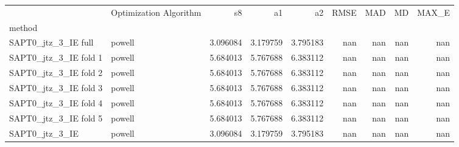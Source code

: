 \begin{tabular}{llrrrrrrr}
 & Optimization Algorithm & s8 & a1 & a2 & RMSE & MAD & MD & MAX_E \\
method &  &  &  &  &  &  &  &  \\
SAPT0_jtz_3_IE full & powell & 3.096084 & 3.179759 & 3.795183 & nan & nan & nan & nan \\
SAPT0_jtz_3_IE fold 1 & powell & 5.684013 & 5.767688 & 6.383112 & nan & nan & nan & nan \\
SAPT0_jtz_3_IE fold 2 & powell & 5.684013 & 5.767688 & 6.383112 & nan & nan & nan & nan \\
SAPT0_jtz_3_IE fold 3 & powell & 5.684013 & 5.767688 & 6.383112 & nan & nan & nan & nan \\
SAPT0_jtz_3_IE fold 4 & powell & 5.684013 & 5.767688 & 6.383112 & nan & nan & nan & nan \\
SAPT0_jtz_3_IE fold 5 & powell & 5.684013 & 5.767688 & 6.383112 & nan & nan & nan & nan \\
SAPT0_jtz_3_IE & powell & 3.096084 & 3.179759 & 3.795183 & nan & nan & nan & nan \\
\end{tabular}
